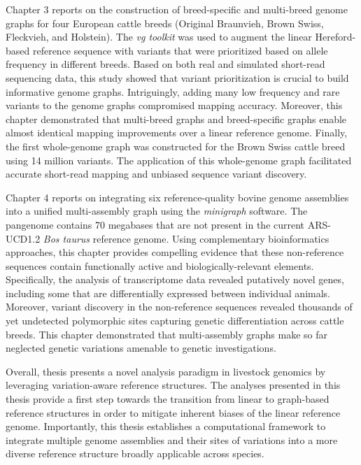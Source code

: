 \documentclass[11 pt, a4paper, notitlepage, twoside]{report}
\begin{document}
Chapter 3 reports on the construction of breed-specific and multi-breed genome graphs for four European cattle breeds (Original Braunvieh, Brown Swiss, Fleckvieh, and Holstein).  The \emph{vg toolkit} was used to augment the linear Hereford-based reference sequence with variants that were prioritized based on allele frequency in different breeds. Based on both real and simulated short-read sequencing data, this study showed that variant prioritization is crucial to build informative genome graphs. Intriguingly, adding many low frequency and rare variants to the genome graphs compromised mapping accuracy. Moreover, this chapter demonstrated that multi-breed graphs and breed-specific graphs enable almost identical mapping improvements over a linear reference genome. Finally, the first whole-genome graph was constructed for the Brown Swiss cattle breed using 14 million variants. The application of this whole-genome graph facilitated accurate short-read mapping and unbiased sequence variant discovery. 

\thispagestyle{plain}

Chapter 4 reports on integrating six reference-quality bovine genome assemblies into a unified multi-assembly graph using the \emph{minigraph} software. The pangenome contains 70 megabases that are not present in the current ARS-UCD1.2 \emph{Bos taurus} reference genome. Using complementary bioinformatics approaches, this chapter provides compelling evidence that these non-reference sequences contain functionally active and biologically-relevant elements. Specifically, the analysis of transcriptome data revealed putatively novel genes, including some that are differentially expressed between individual animals. Moreover, variant discovery in the non-reference sequences revealed thousands of yet undetected polymorphic sites capturing genetic differentiation across cattle breeds. This chapter demonstrated that multi-assembly graphs make so far neglected genetic variations amenable to genetic investigations. 

Overall, thesis presents a novel analysis paradigm in livestock genomics by leveraging variation-aware reference structures. The analyses presented in this thesis provide a first step towards the transition from linear to graph-based reference structures in order to mitigate inherent biases of the linear reference genome. Importantly, this thesis establishes a computational framework to integrate multiple genome assemblies and their sites of variations into a more diverse reference structure broadly applicable across species. 
\end{document}
